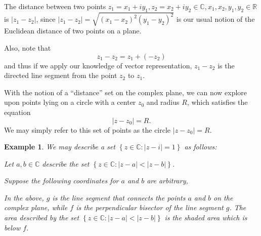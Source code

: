 \documentclass[11pt, oneside]{book}
\theoremstyle{break}
\newtheorem{eg}{Example}[section]
\newcommand{\abs}[1]{\left|#1\right|}						%
\begin{document}
The distance between two points $z_1 = x_1 + iy_1, z_2 = x_2 + iy_2 \in \mathbb{C}, x_1, x_2, y_1, y_2 \in \mathbb{R}$ is $\abs{z_1 - z_2}$, since $\abs{z_1 - z_2} = \sqrt{(x_1 - x_2)^2 (y_1 - y_2)^2}$ is our usual notion of the Euclidean distance of two points on a plane.

Also, note that
\begin{equation*}
	z_1 - z_2 = z_1 + (-z_2)
\end{equation*}
and thus if we apply our knowledge of vector representation, $z_1 - z_2$ is the directed line segment from the point $z_2$ to $z_1$.

With the notion of a ``distance'' set on the complex plane, we can now explore upon points lying on a circle with a center $z_0$ and radius $R$, which satisfies the equation
\begin{equation*}
	\abs{z - z_0} = R.
\end{equation*}
We may simply refer to this set of points as the circle $\abs{z - z_0} = R$.

\begin{eg}
	We may describe a set $\left\{z \in \mathbb{C} : \abs{z -i} = 1 \right\}$ as follows:

	\begin{center}
	\end{center}

	Let $a, b \in \mathbb{C}$ describe the set $\left\{z \in \mathbb{C} : \abs{z - a} < \abs{z - b} \right\}$.

	Suppose the following coordinates for $a$ and $b$ are arbitrary,

	\begin{center}
	\end{center}

	In the above, $g$ is the line segment that connects the points $a$ and $b$ on the complex plane, while $f$ is the perpendicular bisector of the line segment $g$. The area described by the set $\left\{z \in \mathbb{C} : \abs{z - a} < \abs{z - b} \right\}$ is the shaded area which is below $f$.
\end{eg}
\end{document}

